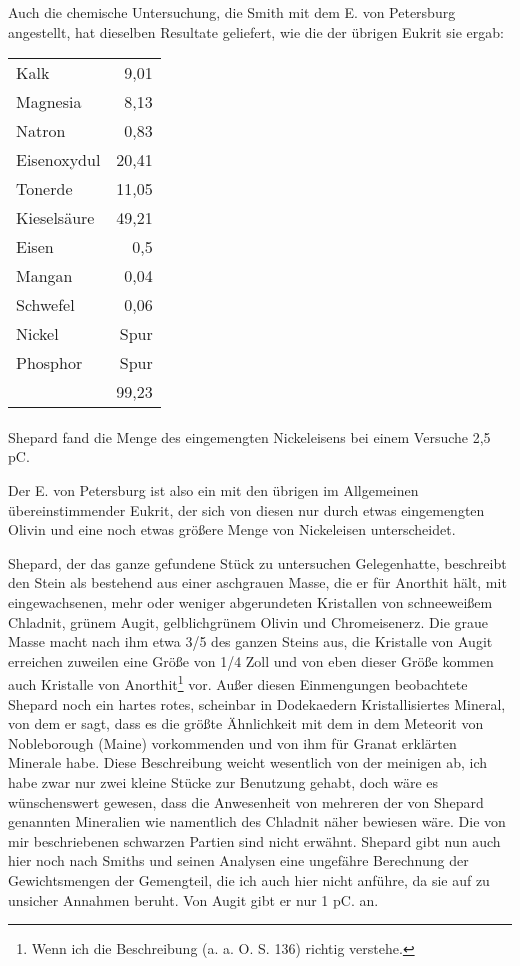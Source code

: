 \documentclass[a4paper, 11pt, oneside]{article}
\begin{document}
Auch die chemische Untersuchung, die Smith mit dem E. von Petersburg angestellt, hat dieselben Resultate geliefert, wie die der übrigen Eukrit sie ergab:
\begin{center}
\begin{tabular}{ l r }
    Kalk & 9,01\\
    Magnesia & 8,13\\
    Natron & 0,83\\
    Eisenoxydul & 20,41\\
    Tonerde & 11,05\\
    Kieselsäure & 49,21\\
    Eisen & 0,5\\
    Mangan & 0,04\\
    Schwefel & 0,06\\
    Nickel & Spur\\
    Phosphor & Spur\\
     & 99,23\\
\end{tabular}
\end{center}
\paragraph{}
Shepard fand die Menge des eingemengten Nickeleisens bei einem Versuche 2,5 pC.

Der E. von Petersburg ist also ein mit den übrigen im Allgemeinen übereinstimmender Eukrit, der sich von diesen nur durch etwas eingemengten Olivin und eine noch etwas größere Menge von Nickeleisen unterscheidet.

Shepard, der das ganze gefundene Stück zu untersuchen Gelegenhatte, beschreibt den Stein als bestehend aus einer aschgrauen Masse, die er für Anorthit hält, mit eingewachsenen, mehr oder weniger abgerundeten Kristallen von schneeweißem Chladnit, grünem Augit, gelblichgrünem Olivin und Chromeisenerz. Die graue Masse macht nach ihm etwa 3/5 des ganzen Steins aus, die Kristalle von Augit erreichen zuweilen eine Größe von 1/4 Zoll und von eben dieser Größe kommen auch Kristalle von Anorthit\footnote{Wenn ich die Beschreibung (a. a. O. S. 136) richtig verstehe.} vor. Außer diesen Einmengungen beobachtete Shepard noch ein hartes rotes, scheinbar in Dodekaedern Kristallisiertes Mineral, von dem er sagt, dass es die größte Ähnlichkeit mit dem in dem Meteorit von Nobleborough (Maine) vorkommenden und von ihm für Granat erklärten Minerale habe. Diese Beschreibung weicht wesentlich von der meinigen ab, ich habe zwar nur zwei kleine Stücke zur Benutzung gehabt, doch wäre es wünschenswert gewesen, dass die Anwesenheit von mehreren der von Shepard genannten Mineralien wie namentlich des Chladnit näher bewiesen wäre. Die von mir beschriebenen schwarzen Partien sind nicht erwähnt. Shepard gibt nun auch hier noch nach Smiths und seinen Analysen eine ungefähre Berechnung der Gewichtsmengen der Gemengteil, die ich auch hier nicht anführe, da sie auf zu unsicher Annahmen beruht. Von Augit gibt er nur 1 pC. an.
\end{document}
